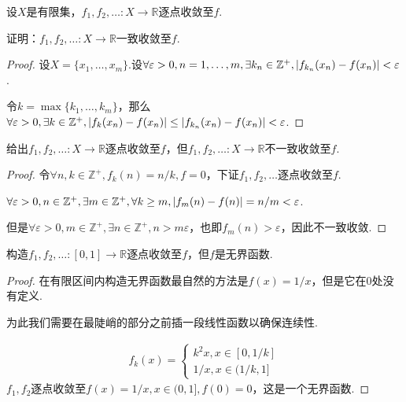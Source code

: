 \begin{problem}[1]\label{2.E.1}
    设\(X\)是有限集，\(f_1, f_2, \dots: X \to \mathbb{R}\)逐点收敛至\(f\).

    证明：\(f_1, f_2, \dots: X \to \mathbb{R}\)一致收敛至\(f\).
\end{problem}

\begin{proof}
    设\(X=\{x_1, \dots, x_m\}\).设\(\forall \varepsilon>0, n=1, \dots, m, \exists k_n \in \mathbb{Z}^+, \abs*{f_{k_n}(x_n)-f(x_n)}<\varepsilon\).

    令\(k=\max\{k_1, \dots, k_m\}\)，那么\(\forall \varepsilon>0, \exists k \in \mathbb{Z}^+, \abs*{f_k(x_n)-f(x_n)} \leq \abs*{f_{k_n}(x_n)-f(x_n)}<\varepsilon\).
\end{proof}

\begin{problem}[2]\label{2.E.2}
    给出\(f_1, f_2, \dots: X \to \mathbb{R}\)逐点收敛至\(f\)，但\(f_1, f_2, \dots: X \to \mathbb{R}\)不一致收敛至\(f\).
\end{problem}

\begin{proof}
    令\(\forall n,k \in \mathbb{Z}^+, f_k(n)=n/k, f=0\)，下证\(f_1, f_2, \dots\)逐点收敛至\(f\).
    
    \(\forall \varepsilon>0, n \in \mathbb{Z}^+, \exists m \in \mathbb{Z}^+, \forall k \geq m, \abs*{f_m(n)-f(n)}=n/m<\varepsilon\).

    但是\(\forall \varepsilon>0, m \in \mathbb{Z}^+, \exists n \in \mathbb{Z}^+, n>m \varepsilon\)，也即\(f_m(n)>\varepsilon\)，因此不一致收敛.
\end{proof}

\begin{problem}[3]\label{2.E.3}
    构造\(f_1, f_2, \dots: [0,1] \to \mathbb{R}\)逐点收敛至\(f\)，但\(f\)是无界函数.
\end{problem}

\begin{proof}
    {\kaishu 在有限区间内构造无界函数最自然的方法是\(f(x)=1/x\)，但是它在\(0\)处没有定义.
    
    为此我们需要在最陡峭的部分之前插一段线性函数以确保连续性.}
    \begin{align*}
        f_k(x)=
        \begin{cases}
            k^2 x, x \in [0,1/k] \\
            1/x, x \in (1/k,1]
        \end{cases}
    \end{align*}
    \(f_1, f_2\)逐点收敛至\(f(x)=1/x, x \in (0,1], f(0)=0\)，这是一个无界函数.
\end{proof}

